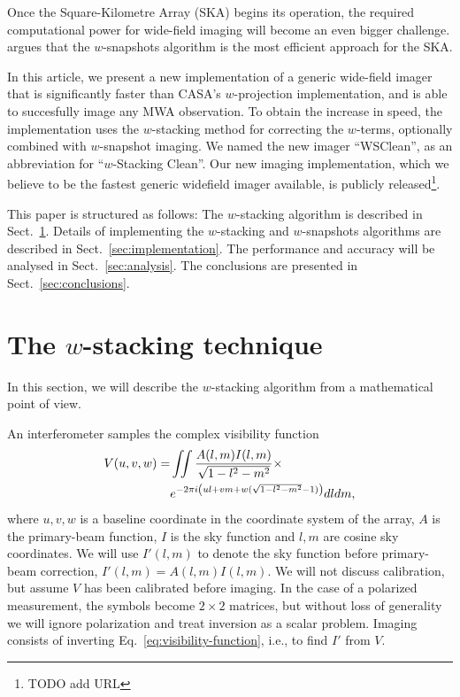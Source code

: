 \documentclass[useAMS,usenatbib]{mn2e}
\begin{document}
Once the Square-Kilometre Array (SKA) begins its operation, the required computational power for wide-field imaging will become an even bigger challenge. \citet{widefield-imaging-ska-cornwell} argues that the $w$-snapshots algorithm is the most efficient approach for the SKA.

In this article, we present a new implementation of a generic wide-field imager that is significantly faster than CASA's $w$-projection implementation, and is able to succesfully image any MWA observation. To obtain the increase in speed, the implementation uses the $w$-stacking method for correcting the $w$-terms, optionally combined with $w$-snapshot imaging. We named the new imager ``WSClean'', as an abbreviation for ``$w$-Stacking Clean''. Our new imaging implementation, which we believe to be the fastest generic widefield imager available, is publicly released\footnote{TODO add URL}.

This paper is structured as follows: The $w$-stacking algorithm is described in Sect.~\ref{sec:wstacking}. Details of implementing the $w$-stacking and $w$-snapshots algorithms are described in Sect.~\ref{sec:implementation}. The performance and accuracy will be analysed in Sect.~\ref{sec:analysis}. The conclusions are presented in Sect.~\ref{sec:conclusions}.

\section{The $w$-stacking technique} \label{sec:wstacking}
In this section, we will describe the $w$-stacking algorithm from a mathematical point of view.

An interferometer samples the complex visibility function
\begin{align}\notag
V(u,v,w) = & \iint \frac{A(l,m) I(l,m)}{\sqrt{1-l^2-m^2}} \times \\ \label{eq:visibility-function}
& e^{-2\pi i \left(ul + vm + w(\sqrt{1-l^2-m^2}-1)\right)} dl dm,
\end{align}
where $u,v,w$ is a baseline coordinate in the coordinate system of the array, $A$ is the primary-beam function, $I$ is the sky function and $l,m$ are cosine sky coordinates. We will use $I'(l,m)$ to denote the sky function before primary-beam correction, $I'(l,m)=A(l,m)I(l,m)$. We will not discuss calibration, but assume $V$ has been calibrated before imaging. In the case of a polarized measurement, the symbols become $2\times 2$ matrices, but without loss of generality we will ignore polarization and treat inversion as a scalar problem. Imaging consists of inverting Eq.~\eqref{eq:visibility-function}, i.e., to find $I'$ from $V$.
\end{document}
